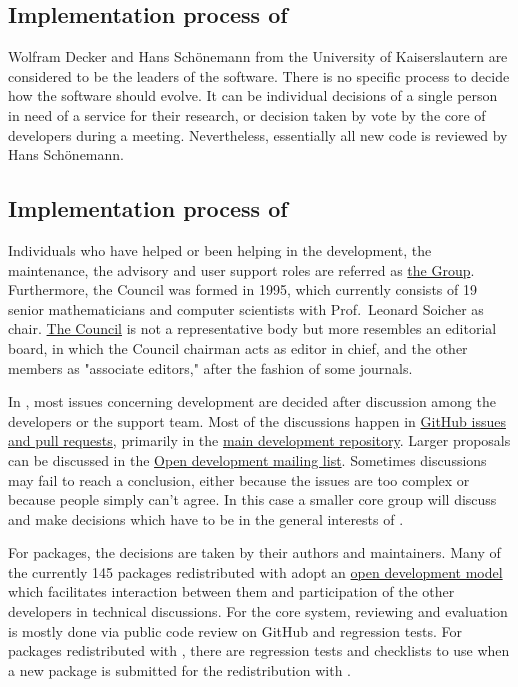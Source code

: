 \documentclass{deliverablereport}
\begin{document}
\subsection{Implementation process of \Singular}

Wolfram Decker and Hans Schönemann from the University of Kaiserslautern are considered to be the leaders of the \Singular software.
There is no specific process to decide how the software should evolve. It can be individual decisions of a single person in need of a service for their research, or decision taken by vote by the core of \Singular developers during a meeting.
Nevertheless, essentially all new code is reviewed by Hans Schönemann.

\subsection{Implementation process of \GAP}

Individuals who have helped or been helping in the development, the
maintenance, the advisory and user support roles are referred as
\href{https://www.gap-system.org/Contacts/People/people.html}{the \GAP
  Group}.  Furthermore, the \GAP Council was formed in 1995, which
currently consists of 19 senior mathematicians and computer
scientists with Prof.~Leonard Soicher as
chair. \href{https://www.gap-system.org/Contacts/People/Council/council.html}{The
  \GAP Council} is not a representative body but more resembles an
editorial board, in which the Council chairman acts as editor in
chief, and the other members as "associate editors," after
the fashion of some journals.

In \GAP, most issues concerning development are decided after
discussion among the developers or the support team. Most of the
discussions happen in \href{https://github.com/gap-system}{GitHub
  issues and pull requests}, primarily in the 
\href{https://github.com/gap-system/gap}{main development repository}.
Larger proposals can be discussed in the
\href{http://mail.gap-system.org/mailman/listinfo/gap}{Open \GAP
  development mailing list}. Sometimes discussions may fail to reach a
conclusion, either because the issues are too complex or because
people simply can’t agree. In this case a smaller core group will
discuss and make decisions which have to be in the general interests
of \GAP.

For \GAP packages, the decisions are taken by their authors and
maintainers. Many of the currently 145 packages redistributed with \GAP
adopt an \href{http://gap-packages.github.io/}{open development model}
which facilitates interaction between them and participation of the
other \GAP developers in technical discussions.  For the
core \GAP system, reviewing and evaluation is mostly done via public
code review on GitHub and regression tests. For \GAP packages
redistributed with \GAP, there are regression tests and checklists to
use when a new package is submitted for the redistribution with \GAP.
\end{document}
